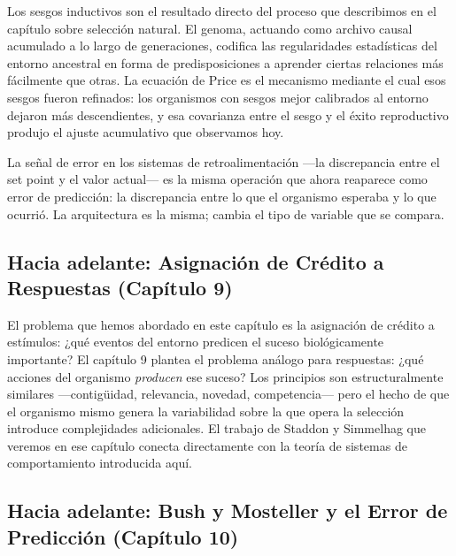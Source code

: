 \documentclass[
  letterpaper,
  DIV=11,
  numbers=noendperiod]{scrreprt}
\begin{document}
\begin{tcolorbox}[enhanced jigsaw, arc=.35mm, bottomrule=.15mm, breakable, colback=white, colframe=quarto-callout-note-color-frame, left=2mm, leftrule=.75mm, opacityback=0, rightrule=.15mm, toprule=.15mm]
Los sesgos inductivos son el resultado directo del proceso que
describimos en el capítulo sobre selección natural. El genoma, actuando
como archivo causal acumulado a lo largo de generaciones, codifica las
regularidades estadísticas del entorno ancestral en forma de
predisposiciones a aprender ciertas relaciones más fácilmente que otras.
La ecuación de Price es el mecanismo mediante el cual esos sesgos fueron
refinados: los organismos con sesgos mejor calibrados al entorno dejaron
más descendientes, y esa covarianza entre el sesgo y el éxito
reproductivo produjo el ajuste acumulativo que observamos hoy.

La señal de error en los sistemas de retroalimentación ---la
discrepancia entre el set point y el valor actual--- es la misma
operación que ahora reaparece como error de predicción: la discrepancia
entre lo que el organismo esperaba y lo que ocurrió. La arquitectura es
la misma; cambia el tipo de variable que se compara.

\subsection{Hacia adelante: Asignación de Crédito a Respuestas (Capítulo
9)}\label{hacia-adelante-asignaciuxf3n-de-cruxe9dito-a-respuestas-capuxedtulo-9}

El problema que hemos abordado en este capítulo es la asignación de
crédito a estímulos: ¿qué eventos del entorno predicen el suceso
biológicamente importante? El capítulo 9 plantea el problema análogo
para respuestas: ¿qué acciones del organismo \emph{producen} ese suceso?
Los principios son estructuralmente similares ---contigüidad,
relevancia, novedad, competencia--- pero el hecho de que el organismo
mismo genera la variabilidad sobre la que opera la selección introduce
complejidades adicionales. El trabajo de Staddon y Simmelhag que veremos
en ese capítulo conecta directamente con la teoría de sistemas de
comportamiento introducida aquí.

\subsection{Hacia adelante: Bush y Mosteller y el Error de Predicción
(Capítulo
10)}\label{hacia-adelante-bush-y-mosteller-y-el-error-de-predicciuxf3n-capuxedtulo-10}


\end{tcolorbox}
\end{document}
